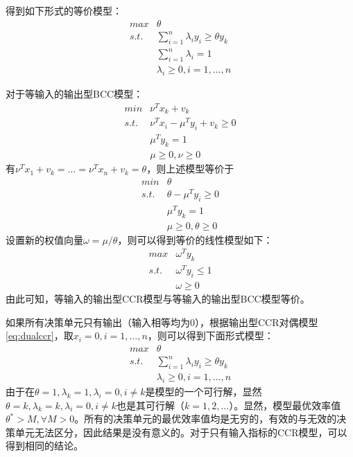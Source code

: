 得到如下形式的等价模型：
\begin{equation}
\begin{array}{ll}\label{eq:unitinputccr}
    \textit{max} & \theta\\
    \textit{s.t.} & \sum\limits_{i=1}^n \lambda_i y_i \ge \theta y_k\\
    & \sum\limits_{i=1}^n \lambda_i = 1\\
    & \lambda_i \ge 0,i = 1,\ldots, n
\end{array}
\end{equation}

对于等输入的输出型BCC模型：
\begin{equation}
\begin{array}{ll}
    \textit{min} & \nu^T x_k + v_k \\
    \textit{s.t.} & \nu^T x_i - \mu^T y_i + v_k \ge 0\\
    & \mu^T y_k = 1\\
    & \mu \ge 0, \nu \ge 0
\end{array}
\end{equation}
有$\nu^T x_1 + v_k = \ldots = \nu^T x_n + v_k = \theta$，则上述模型等价于
\begin{equation}
\begin{array}{ll}
    \textit{min} & \theta \\
    \textit{s.t.} & \theta - \mu^T y_i \ge 0\\
    & \mu^T y_k = 1\\
    & \mu \ge 0,\theta \ge 0
\end{array}
\end{equation}
设置新的权值向量$\omega = \mu/\theta$，则可以得到等价的线性模型如下：
\begin{equation}
\begin{array}{ll}
    \textit{max} & \omega^T y_k \\
    \textit{s.t.} & \omega^T y_i \le 1\\
    & \omega \ge 0
\end{array}
\end{equation}
由此可知，等输入的输出型CCR模型与等输入的输出型BCC模型等价\cite{lovell1999radial,liu2011study,kostrzewa2011data}。

如果所有决策单元只有输出（输入相等均为0），根据输出型CCR对偶模型\eqref{eq:dualccr}，取$x_i =0, i =1,\ldots,n$，则可以得到下面形式模型：
\begin{equation}\label{eq:ccr-output}
\begin{array}{ll}
    \textit{max} & \theta\\
    \textit{s.t.} & \sum\limits_{i=1}^n \lambda_i y_i \ge \theta y_k\\
    & \lambda_i \ge 0,i = 1,\ldots, n
\end{array}
\end{equation}
由于在$\theta = 1,\lambda_k = 1, \lambda_i = 0, i\ne k$是模型的一个可行解，显然$\theta = k, \lambda_k = k, \lambda_i=0,i\ne k$也是其可行解（$k = 1,2,\ldots$）。显然，模型最优效率值$\theta^* > M,\forall M >0$。所有的决策单元的最优效率值均是无穷的，有效的与无效的决策单元无法区分，因此结果是没有意义的\cite{lovell1999radial}。对于只有输入指标的CCR模型，可以得到相同的结论。

